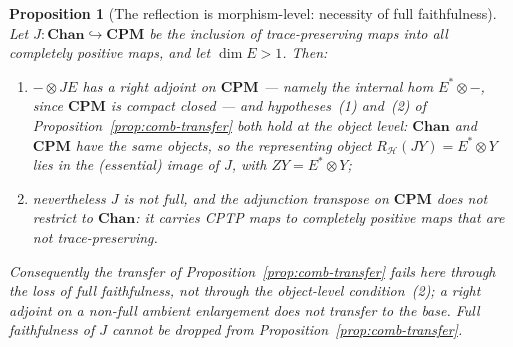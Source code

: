 \documentclass[11pt]{article}
\newtheorem{proposition}[theorem]{Proposition}
\begin{document}
\begin{proposition}[The reflection is morphism-level: necessity of full faithfulness]
\label{prop:reflection-necessary}
Let $J:\mathbf{Chan}\hookrightarrow\mathbf{CPM}$ be the inclusion of
trace-preserving maps into all completely positive maps, and let
$\dim E>1$. Then:
\begin{enumerate}
\item $-\otimes JE$ has a right adjoint on $\mathbf{CPM}$ --- namely the
internal hom $E^{*}\otimes-$, since $\mathbf{CPM}$ is compact closed --- and
hypotheses~(1) and~(2) of Proposition~\ref{prop:comb-transfer} both hold at the
object level: $\mathbf{Chan}$ and $\mathbf{CPM}$ have the same objects, so the
representing object $R_{\mathcal H}(JY)=E^{*}\otimes Y$ lies in the (essential)
image of $J$, with $ZY=E^{*}\otimes Y$;
\item nevertheless $J$ is \emph{not full}, and the adjunction transpose on
$\mathbf{CPM}$ does not restrict to $\mathbf{Chan}$: it carries CPTP maps to
completely positive maps that are not trace-preserving.
\end{enumerate}
Consequently the transfer of Proposition~\ref{prop:comb-transfer} fails here
through the loss of full faithfulness, not through the object-level
condition~(2); a right adjoint on a non-full ambient enlargement does not
transfer to the base. Full faithfulness of $J$ cannot be dropped from
Proposition~\ref{prop:comb-transfer}.
\end{proposition}
\end{document}
